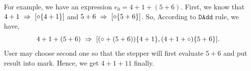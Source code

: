 For example, we have an expression $e_0 = 4 + 1 + (5 + 6)$. First, we know that $4 + 1 ~\Rightarrow~ [\circ \{4 + 1\}]$ and $5 + 6 ~\Rightarrow~ [\circ \{5 + 6\}]$. So, According to $\mathtt{DAdd}$ rule, we have,
$$
4 + 1 + (5 + 6) ~\Rightarrow~ [(\circ + (5 + 6)) \{4 + 1\}, (4 + 1 + \circ) \{5 + 6\}].
$$
User may choose second one so that the stepper will first evaluate $5 + 6$ and put result into mark. Hence, we get $4 + 1+ 11$ finally.
